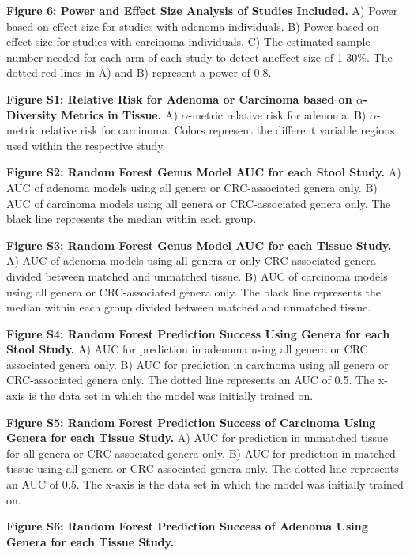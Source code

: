 \documentclass[12pt,]{article}
\begin{document}
\textbf{Figure 6: Power and Effect Size Analysis of Studies Included.}
A) Power based on effect size for studies with adenoma individuals. B)
Power based on effect size for studies with carcinoma individuals. C)
The estimated sample number needed for each arm of each study to detect
aneffect size of 1-30\%. The dotted red lines in A) and B) represent a
power of 0.8.

\newpage

\textbf{Figure S1: Relative Risk for Adenoma or Carcinoma based on
\(\alpha\)-Diversity Metrics in Tissue.} A) \(\alpha\)-metric relative
risk for adenoma. B) \(\alpha\)-metric relative risk for carcinoma.
Colors represent the different variable regions used within the
respective study.

\textbf{Figure S2: Random Forest Genus Model AUC for each Stool Study.}
A) AUC of adenoma models using all genera or CRC-associated genera only.
B) AUC of carcinoma models using all genera or CRC-associated genera
only. The black line represents the median within each group.

\textbf{Figure S3: Random Forest Genus Model AUC for each Tissue Study.}
A) AUC of adenoma models using all genera or only CRC-associated genera
divided between matched and unmatched tissue. B) AUC of carcinoma models
using all genera or CRC-associated genera only. The black line
represents the median within each group divided between matched and
unmatched tissue.

\textbf{Figure S4: Random Forest Prediction Success Using Genera for
each Stool Study.} A) AUC for prediction in adenoma using all genera or
CRC associated genera only. B) AUC for prediction in carcinoma using all
genera or CRC-associated genera only. The dotted line represents an AUC
of 0.5. The x-axis is the data set in which the model was initially
trained on.

\textbf{Figure S5: Random Forest Prediction Success of Carcinoma Using
Genera for each Tissue Study.} A) AUC for prediction in unmatched tissue
for all genera or CRC-associated genera only. B) AUC for prediction in
matched tissue using all genera or CRC-associated genera only. The
dotted line represents an AUC of 0.5. The x-axis is the data set in
which the model was initially trained on.

\textbf{Figure S6: Random Forest Prediction Success of Adenoma Using
Genera for each Tissue Study.}

\newpage
\end{document}
